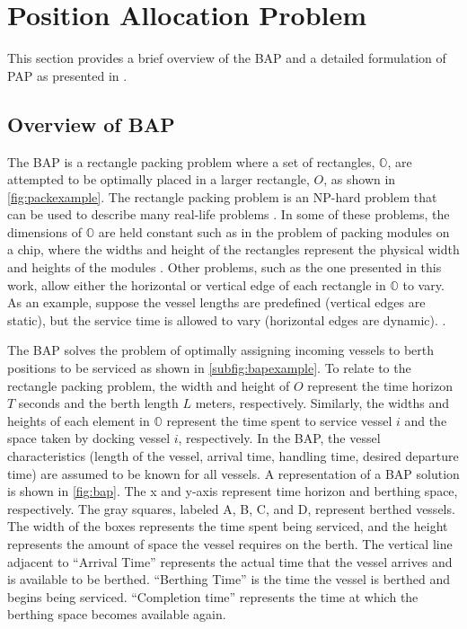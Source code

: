 \documentclass[ee,thesis]{usuthesis}
\begin{document}
\section{Position Allocation Problem}
\label{sec:the-position-allocation-problem}
This section provides a brief overview of the BAP and a detailed formulation of PAP as presented in
\cite{qarebagh-2019-optim-sched}.

\subsection{Overview of BAP}
\label{sec:overview-of-bap}
The BAP is a rectangle packing problem where a set of rectangles, \(\mathbb{O}\), are attempted to be optimally placed in
a larger rectangle, \(O\), as shown in \autoref{fig:packexample}. The rectangle packing problem is an NP-hard problem that
can be used to describe many real-life problems \cite{bruin-2013-rectan-packin,murata-1995-rectan}. In some of these
problems, the dimensions of \(\mathbb{O}\) are held constant such as in the problem of packing modules on a chip, where
the widths and height of the rectangles represent the physical width and heights of the modules
\cite{murata-1995-rectan}. Other problems, such as the one presented in this work, allow either the horizontal or
vertical edge of each rectangle in \(\mathbb{O}\) to vary. As an example, suppose the vessel lengths are predefined
(vertical edges are static), but the service time is allowed to vary (horizontal edges are dynamic).
\cite{buhrkal-2011-model-discr}.

The BAP solves the problem of optimally assigning incoming vessels to berth positions to be serviced as shown in
\autoref{subfig:bapexample}. To relate to the rectangle packing problem, the width and height of \(O\) represent the time
horizon \(T\) seconds and the berth length \(L\) meters, respectively. Similarly, the widths and heights of each element in
\(\mathbb{O}\) represent the time spent to service vessel \(i\) and the space taken by docking vessel \(i\), respectively. In
the BAP, the vessel characteristics (length of the vessel, arrival time, handling time, desired departure time) are
assumed to be known for all vessels. A representation of a BAP solution is shown in \autoref{fig:bap}. The x and y-axis
represent time horizon and berthing space, respectively. The gray squares, labeled A, B, C, and D, represent berthed
vessels. The width of the boxes represents the time spent being serviced, and the height represents the amount of space
the vessel requires on the berth. The vertical line adjacent to ``Arrival Time'' represents the actual time that the
vessel arrives and is available to be berthed. ``Berthing Time'' is the time the vessel is berthed and begins being
serviced. ``Completion time'' represents the time at which the berthing space becomes available again.
\end{document}
